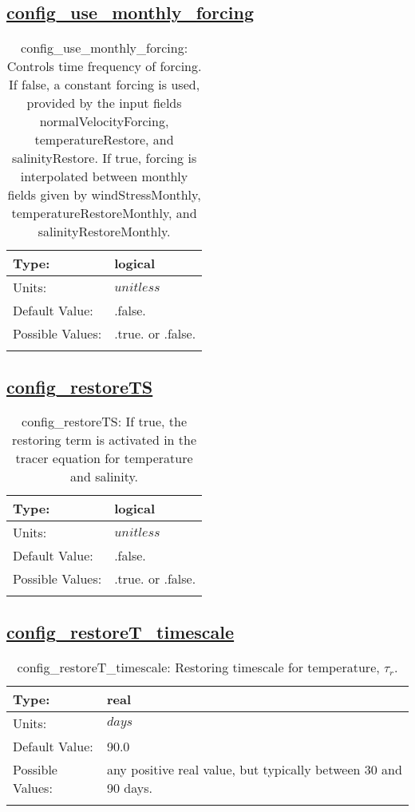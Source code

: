 \subsection[config\_use\_monthly\_forcing]{\hyperref[sec:nm_tab_forcing]{config\_use\_monthly\_forcing}}
\label{subsec:nm_sec_config_use_monthly_forcing}
\begin{center}
\begin{longtable}{| p{2.0in} | p{4.0in} |}
    \hline
    Type: & logical \\
    \hline
    Units: & $unitless$ \\
    \hline
    Default Value: & .false. \\
    \hline
    Possible Values: & .true. or .false. \\
    \hline
    \caption{config\_use\_monthly\_forcing: Controls time frequency of forcing.  If false, a constant forcing is used, provided by the input fields normalVelocityForcing, temperatureRestore, and salinityRestore.  If true, forcing is interpolated between monthly fields given by windStressMonthly, temperatureRestoreMonthly, and salinityRestoreMonthly.}
\end{longtable}
\end{center}
\subsection[config\_restoreTS]{\hyperref[sec:nm_tab_forcing]{config\_restoreTS}}
\label{subsec:nm_sec_config_restoreTS}
\begin{center}
\begin{longtable}{| p{2.0in} | p{4.0in} |}
    \hline
    Type: & logical \\
    \hline
    Units: & $unitless$ \\
    \hline
    Default Value: & .false. \\
    \hline
    Possible Values: & .true. or .false. \\
    \hline
    \caption{config\_restoreTS: If true, the restoring term is activated in the tracer equation for temperature and salinity.}
\end{longtable}
\end{center}
\subsection[config\_restoreT\_timescale]{\hyperref[sec:nm_tab_forcing]{config\_restoreT\_timescale}}
\label{subsec:nm_sec_config_restoreT_timescale}
\begin{center}
\begin{longtable}{| p{2.0in} | p{4.0in} |}
    \hline
    Type: & real \\
    \hline
    Units: & $days$ \\
    \hline
    Default Value: & 90.0 \\
    \hline
    Possible Values: & any positive real value, but typically between 30 and 90 days. \\
    \hline
    \caption{config\_restoreT\_timescale:  Restoring timescale for temperature,  $\tau_r.$ }
\end{longtable}
\end{center}
